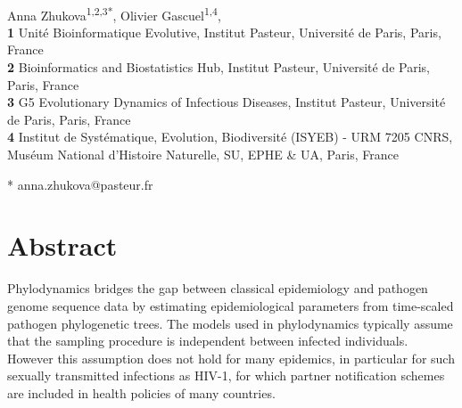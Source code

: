 \documentclass[10pt,letterpaper]{article}
\begin{document}
\vspace*{0.2in}

\begin{flushleft}
{\Large
\textbf{} %
}
\newline
\\
Anna Zhukova\textsuperscript{1,2,3*},
Olivier Gascuel\textsuperscript{1,4},
\\
\bigskip
\textbf{1} Unit\'e Bioinformatique Evolutive, Institut Pasteur, Université de Paris, Paris, France
\\
\textbf{2} Bioinformatics and Biostatistics Hub, Institut Pasteur, Université de Paris, Paris, France
\\
\textbf{3} G5 Evolutionary Dynamics of Infectious Diseases, Institut Pasteur, Université de Paris, Paris, France
\\
\textbf{4} Institut de Syst\'{e}matique, Evolution, Biodiversit\'{e} (ISYEB) - URM 7205 CNRS, Mus\'{e}um National d'Histoire Naturelle, SU, EPHE \& UA, Paris, France
\\
\bigskip



* anna.zhukova@pasteur.fr

\end{flushleft}
\section*{Abstract}
Phylodynamics bridges the gap between classical epidemiology and pathogen genome sequence data by estimating epidemiological parameters from time-scaled pathogen phylogenetic trees. The models used in phylodynamics typically assume that the sampling procedure is independent between infected individuals. However this assumption does not hold for many epidemics, in particular for such sexually transmitted infections as HIV-1, for which partner notification schemes are included in health policies of many countries. 
\end{document}
